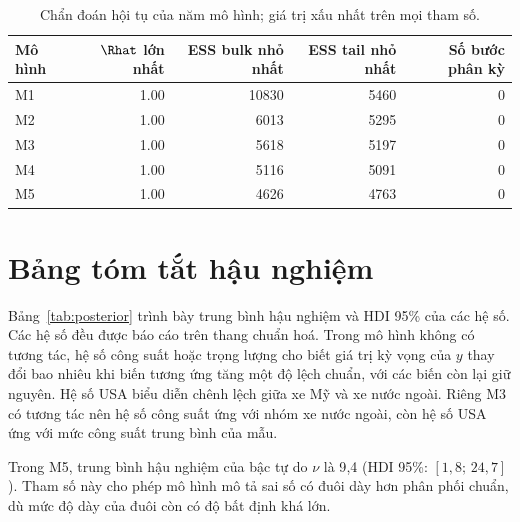 \documentclass[12pt,a4paper]{report}
\begin{document}
\begin{table}[tp]
  \centering
  \caption{Chẩn đoán hội tụ của năm mô hình; giá trị xấu nhất trên mọi tham
    số.}
  \label{tab:diagnostics}
  \begin{tabular}{lrrrr}
    \toprule
    Mô hình & $\Rhat$ lớn nhất & ESS bulk nhỏ nhất & ESS tail nhỏ nhất & Số bước phân kỳ \\
    \midrule
    M1 & \num{1.00} & \num{10830} & \num{5460} & 0 \\
    M2 & \num{1.00} & \num{6013}  & \num{5295} & 0 \\
    M3 & \num{1.00} & \num{5618}  & \num{5197} & 0 \\
    M4 & \num{1.00} & \num{5116}  & \num{5091} & 0 \\
    M5 & \num{1.00} & \num{4626}  & \num{4763} & 0 \\
    \bottomrule
  \end{tabular}
\end{table}


\section{Bảng tóm tắt hậu nghiệm}
\label{sec:posterior}

Bảng~\ref{tab:posterior} trình bày trung bình hậu nghiệm và HDI 95\% của các hệ
số. Các hệ số đều được báo cáo trên
thang chuẩn hoá. Trong mô hình không có tương tác, hệ số công suất hoặc trọng
lượng cho biết giá trị kỳ vọng của $y$ thay đổi bao nhiêu khi biến tương ứng
tăng một độ lệch chuẩn, với các biến còn lại giữ nguyên. Hệ số USA biểu diễn
chênh lệch giữa xe Mỹ và xe nước ngoài. Riêng M3 có tương tác nên hệ số công
suất ứng với nhóm xe nước ngoài, còn hệ số USA ứng với mức công suất trung
bình của mẫu.

Trong M5, trung bình hậu nghiệm của bậc tự do $\nu$ là 9{,}4 (HDI 95\%:
$[1{,}8;\, 24{,}7]$). Tham số này cho phép mô hình mô tả sai số có đuôi dày
hơn phân phối chuẩn, dù mức độ dày của đuôi còn có độ bất định khá lớn.
\end{document}
